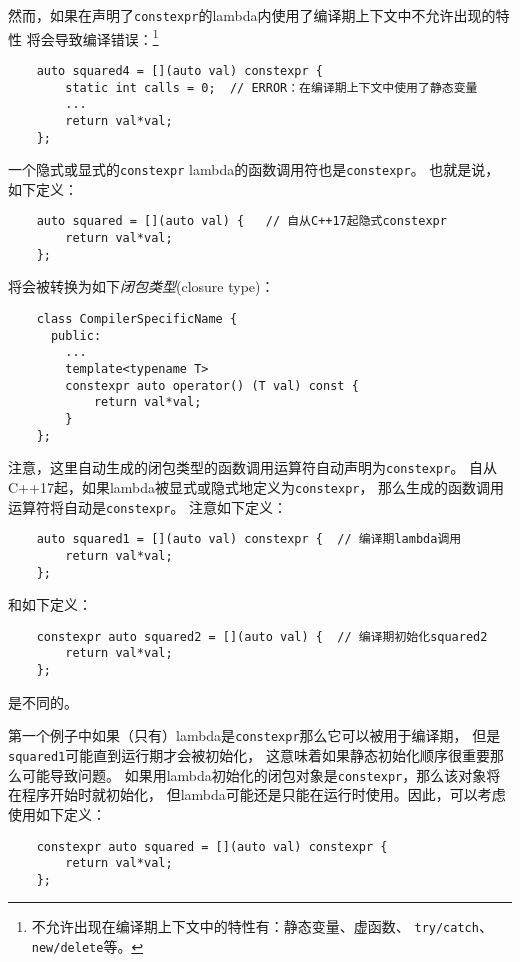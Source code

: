 然而，如果在声明了\texttt{constexpr}的lambda内使用了编译期上下文中不允许出现的特性
将会导致编译错误：\footnote{不允许出现在编译期上下文中的特性有：静态变量、虚函数、
\texttt{try/catch}、\texttt{new/delete}等。}
\begin{lstlisting}
    auto squared4 = [](auto val) constexpr {
        static int calls = 0;  // ERROR：在编译期上下文中使用了静态变量
        ...
        return val*val;
    };
\end{lstlisting}
一个隐式或显式的\texttt{constexpr} lambda的函数调用符也是\texttt{constexpr}。
也就是说，如下定义：
\begin{lstlisting}
    auto squared = [](auto val) {   // 自从C++17起隐式constexpr
        return val*val;
    };
\end{lstlisting}
将会被转换为如下\emph{闭包类型}(closure type)：
\begin{lstlisting}
    class CompilerSpecificName {
      public:
        ...
        template<typename T>
        constexpr auto operator() (T val) const {
            return val*val;
        }
    };
\end{lstlisting}
注意，这里自动生成的闭包类型的函数调用运算符自动声明为\texttt{constexpr}。
自从C++17起，如果lambda被显式或隐式地定义为\texttt{constexpr}，
那么生成的函数调用运算符将自动是\texttt{constexpr}。
注意如下定义：
\begin{lstlisting}
    auto squared1 = [](auto val) constexpr {  // 编译期lambda调用
        return val*val;
    };
\end{lstlisting}
和如下定义：
\begin{lstlisting}
    constexpr auto squared2 = [](auto val) {  // 编译期初始化squared2
        return val*val;
    };
\end{lstlisting}
是不同的。

第一个例子中如果（只有）lambda是\texttt{constexpr}那么它可以被用于编译期，
但是\texttt{squared1}可能直到运行期才会被初始化，
这意味着如果静态初始化顺序很重要那么可能导致问题。
如果用lambda初始化的闭包对象是\texttt{constexpr}，那么该对象将在程序开始时就初始化，
但lambda可能还是只能在运行时使用。因此，可以考虑使用如下定义：
\begin{lstlisting}
    constexpr auto squared = [](auto val) constexpr {
        return val*val;
    };
\end{lstlisting}

